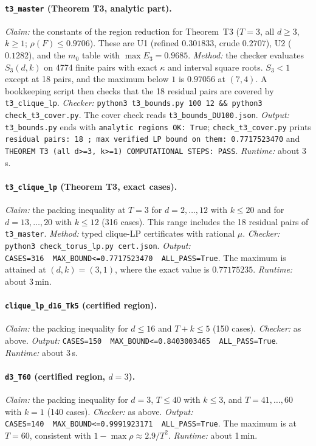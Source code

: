 \documentclass[11pt]{article}
\theoremstyle{definition}
\theoremstyle{remark}
\begin{document}
\paragraph{\texttt{t3\_master} (Theorem T3, analytic part).}
\emph{Claim:} the constants of the region reduction for Theorem~T3 ($T=3$, all $d\ge3$, $k\ge1$; $\rho(F)\le0.9706$). These are U1 (refined $0.301833$, crude $0.2707$), U2 ($0.1282$), and the $m_0$ table with $\max E_3=0.9685$.
\emph{Method:} the checker evaluates $S_3(d,k)$ on 4774 finite pairs with exact $\kappa$ and interval square roots. $S_3<1$ except at 18 pairs, and the maximum below $1$ is $0.97056$ at $(7,4)$. A bookkeeping script then checks that the 18 residual pairs are covered by \texttt{t3\_clique\_lp}.
\emph{Checker:} \texttt{python3 t3\_bounds.py 100 12 \&\& python3 check\_t3\_cover.py}. The cover check reads \texttt{t3\_bounds\_DU100.json}.
\emph{Output:} \texttt{t3\_bounds.py} ends with \texttt{analytic regions OK: True}; \texttt{check\_t3\_cover.py} prints \texttt{residual pairs: 18 ; max verified LP bound on them: 0.7717523470} and \texttt{THEOREM T3 (all d>=3, k>=1) COMPUTATIONAL STEPS: PASS}.
\emph{Runtime:} about 3\,s.

\paragraph{\texttt{t3\_clique\_lp} (Theorem T3, exact cases).}
\emph{Claim:} the packing inequality at $T=3$ for $d=2,\dots,12$ with $k\le20$ and for $d=13,\dots,20$ with $k\le12$ (316 cases). This range includes the 18 residual pairs of \texttt{t3\_master}.
\emph{Method:} typed clique-LP certificates with rational $\mu$.
\emph{Checker:} \texttt{python3 check\_torus\_lp.py cert.json}.
\emph{Output:} \texttt{CASES=316~~MAX\_BOUND<=0.7717523470~~ALL\_PASS=True}. The maximum is attained at $(d,k)=(3,1)$, where the exact value is $0.77175235$.
\emph{Runtime:} about 3\,min.

\paragraph{\texttt{clique\_lp\_d16\_Tk5} (certified region).}
\emph{Claim:} the packing inequality for $d\le16$ and $T+k\le5$ (150 cases).
\emph{Checker:} as above.
\emph{Output:} \texttt{CASES=150~~MAX\_BOUND<=0.8403003465~~ALL\_PASS=True}.
\emph{Runtime:} about 3\,s.

\paragraph{\texttt{d3\_T60} (certified region, $d=3$).}
\emph{Claim:} the packing inequality for $d=3$, $T\le40$ with $k\le3$, and $T=41,\dots,60$ with $k=1$ (140 cases).
\emph{Checker:} as above.
\emph{Output:} \texttt{CASES=140~~MAX\_BOUND<=0.9991923171~~ALL\_PASS=True}. The maximum is at $T=60$, consistent with $1-\max\rho\approx2.9/T^2$.
\emph{Runtime:} about 1\,min.
\end{document}
